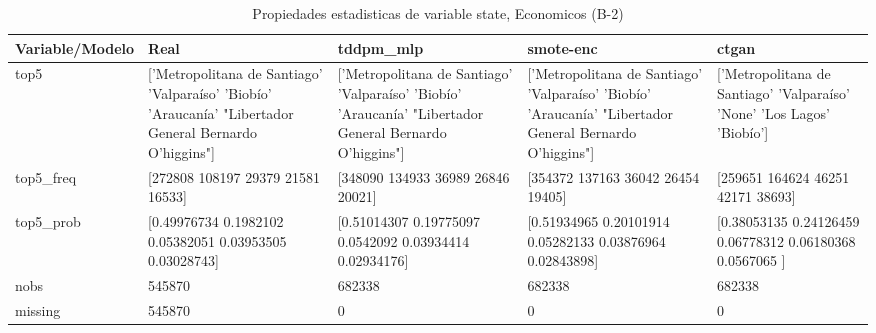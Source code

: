 \begin{table}[H]
\centering
\fontsize{8}{14}\selectfont
\caption{Propiedades  estadisticas de variable state, Economicos (B-2)}
\label{table-stats-economicos-b-2-state}
\begin{tabular}{|l|m{10em}|m{10em}|m{10em}|m{10em}|}
\hline
 \rowcolor[gray]{0.8}
Variable/Modelo & Real & tddpm\_mlp & smote-enc & ctgan \\
\hline top5 & ['Metropolitana de Santiago' 'Valparaíso' 'Biobío' 'Araucanía'
 "Libertador General Bernardo O'higgins"] & ['Metropolitana de Santiago' 'Valparaíso' 'Biobío' 'Araucanía'
 "Libertador General Bernardo O'higgins"] & ['Metropolitana de Santiago' 'Valparaíso' 'Biobío' 'Araucanía'
 "Libertador General Bernardo O'higgins"] & ['Metropolitana de Santiago' 'Valparaíso' 'None' 'Los Lagos' 'Biobío'] \\
\hline top5\_freq & [272808 108197  29379  21581  16533] & [348090 134933  36989  26846  20021] & [354372 137163  36042  26454  19405] & [259651 164624  46251  42171  38693] \\
\hline top5\_prob & [0.49976734 0.1982102  0.05382051 0.03953505 0.03028743] & [0.51014307 0.19775097 0.0542092  0.03934414 0.02934176] & [0.51934965 0.20101914 0.05282133 0.03876964 0.02843898] & [0.38053135 0.24126459 0.06778312 0.06180368 0.0567065 ] \\
\hline nobs & 545870 & 682338 & 682338 & 682338 \\
\hline missing & 545870 & 0 & 0 & 0 \\
\hline
\end{tabular}
\end{table}
